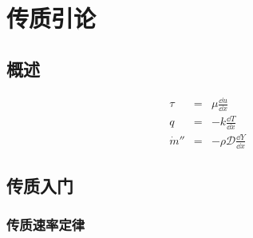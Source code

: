 \section{传质引论}
\subsection{概述}
\begin{eqnarray*}
    \tau &=& \mu \frac{\dd u}{\dd x}\\
    q &=& -k \frac{\dd T}{\dd x}\\
    \dot{m}'' &=& -\rho\mathcal{D} \frac{\dd Y}{\dd x}
\end{eqnarray*}
\subsection{传质入门}
\subsubsection{传质速率定律}

